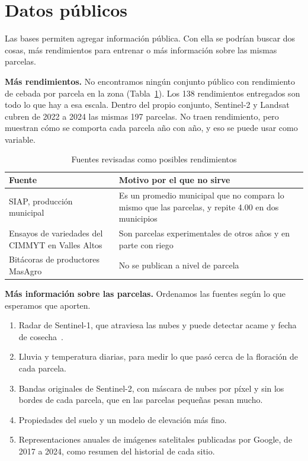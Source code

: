 \section{Datos públicos}\label{sec:externos}
Las bases permiten agregar información pública. Con ella se podrían buscar dos cosas, más rendimientos para entrenar
o más información sobre las mismas parcelas.

\textbf{Más rendimientos.} No encontramos ningún conjunto público con rendimiento de cebada por parcela en la zona
(Tabla~\ref{tab:externos}). Los 138 rendimientos entregados son todo lo que hay a esa escala. Dentro del propio
conjunto, Sentinel-2 y Landsat cubren de 2022 a 2024 las mismas 197 parcelas. No traen rendimiento, pero muestran
cómo se comporta cada parcela año con año, y eso se puede usar como variable.

\begin{table}[!t]
\caption{Fuentes revisadas como posibles rendimientos}\label{tab:externos}
\centering\footnotesize
\begin{tabularx}{\columnwidth}{@{}>{\raggedright\arraybackslash}p{2.4cm}X@{}}
\toprule
Fuente & Motivo por el que no sirve \\
\midrule
SIAP, producción municipal~\cite{siap2026} & Es un promedio municipal que no compara lo mismo que las parcelas, y repite 4.00 en dos municipios \\
Ensayos de variedades del CIMMYT en Valles Altos & Son parcelas experimentales de otros años y en parte con riego \\
Bitácoras de productores MasAgro & No se publican a nivel de parcela \\
\bottomrule
\end{tabularx}
\end{table}

\textbf{Más información sobre las parcelas.} Ordenamos las fuentes según lo que esperamos que aporten.
\begin{enumerate}
  \item Radar de Sentinel-1, que atraviesa las nubes y puede detectar acame y fecha de cosecha~\cite{chauhan2020}.
  \item Lluvia y temperatura diarias, para medir lo que pasó cerca de la floración de cada parcela.
  \item Bandas originales de Sentinel-2, con máscara de nubes por píxel y sin los bordes de cada parcela, que en las
        parcelas pequeñas pesan mucho.
  \item Propiedades del suelo y un modelo de elevación más fino.
  \item Representaciones anuales de imágenes satelitales publicadas por Google, de 2017 a 2024, como resumen del
        historial de cada sitio.
\end{enumerate}
